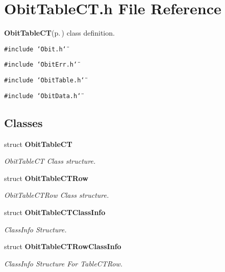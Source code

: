 \section{Obit\-Table\-CT.h File Reference}
\label{ObitTableCT_8h}
{\bf Obit\-Table\-CT}{\rm (p.\,\pageref{structObitTableCT})} class definition. 

{\tt \#include \char`\"{}Obit.h\char`\"{}}\par
{\tt \#include \char`\"{}Obit\-Err.h\char`\"{}}\par
{\tt \#include \char`\"{}Obit\-Table.h\char`\"{}}\par
{\tt \#include \char`\"{}Obit\-Data.h\char`\"{}}\par
\subsection*{Classes}
\begin{CompactItemize}
\item 
struct {\bf Obit\-Table\-CT}
\begin{CompactList}\small\item\em Obit\-Table\-CT Class structure. \item\end{CompactList}\item 
struct {\bf Obit\-Table\-CTRow}
\begin{CompactList}\small\item\em Obit\-Table\-CTRow Class structure. \item\end{CompactList}\item 
struct {\bf Obit\-Table\-CTClass\-Info}
\begin{CompactList}\small\item\em Class\-Info Structure. \item\end{CompactList}\item 
struct {\bf Obit\-Table\-CTRow\-Class\-Info}
\begin{CompactList}\small\item\em Class\-Info Structure For Table\-CTRow. \item\end{CompactList}\end{CompactItemize}
